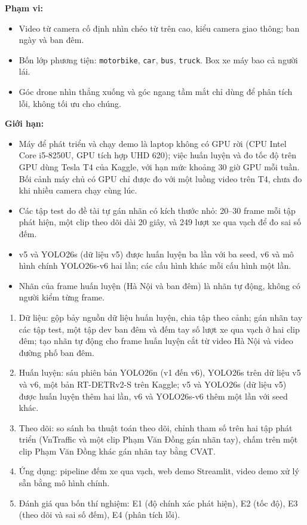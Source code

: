 
\textbf{Phạm vi:}
\begin{itemize}
  \item Video từ camera cố định nhìn chéo từ trên cao, kiểu camera giao thông; ban ngày và ban đêm.
  \item Bốn lớp phương tiện: \texttt{motorbike}, \texttt{car}, \texttt{bus}, \texttt{truck}. Box xe máy bao cả người lái.
  \item Góc drone nhìn thẳng xuống và góc ngang tầm mắt chỉ dùng để phân tích lỗi, không tối ưu cho chúng.
\end{itemize}

\textbf{Giới hạn:}
\begin{itemize}
  \item Máy để phát triển và chạy demo là laptop không có GPU rời (CPU Intel Core i5-8250U, GPU tích hợp UHD 620);
        việc huấn luyện và đo tốc độ trên GPU dùng Tesla T4 của Kaggle, với hạn mức khoảng 30 giờ GPU mỗi tuần. Bối cảnh
        máy chủ có GPU chỉ được đo với một luồng video trên T4, chưa đo khi nhiều camera chạy cùng lúc.
  \item Các tập test do đề tài tự gán nhãn có kích thước nhỏ: 20--30 frame mỗi tập phát hiện, một clip theo dõi dài 20
        giây, và 249 lượt xe qua vạch để đo sai số đếm.
  \item v5 và YOLO26s (dữ liệu v5) được huấn luyện ba lần với ba seed, v6 và mô hình chính YOLO26s-v6 hai lần; các
        cấu hình khác mỗi cấu hình một lần.
  \item Nhãn của frame huấn luyện (Hà Nội và ban đêm) là nhãn tự động, không có người kiểm từng frame.
\end{itemize}


\begin{enumerate}
  \item Dữ liệu: gộp bảy nguồn dữ liệu huấn luyện, chia tập theo cảnh; gán nhãn tay các tập test, một tập dev ban đêm
        và đếm tay số lượt xe qua vạch ở hai clip đêm; tạo nhãn tự động cho frame huấn luyện cắt từ video Hà Nội và
        video đường phố ban đêm.
  \item Huấn luyện: sáu phiên bản YOLO26n (v1 đến v6), YOLO26s trên dữ liệu v5 và v6, một bản RT-DETRv2-S trên
        Kaggle; v5 và YOLO26s (dữ liệu v5) được huấn luyện thêm hai lần, v6 và YOLO26s-v6 thêm một lần với seed khác.
  \item Theo dõi: so sánh ba thuật toán theo dõi, chỉnh tham số trên hai tập phát triển (VnTraffic và một clip Phạm Văn
        Đồng gán nhãn tay), chấm trên một clip Phạm Văn Đồng khác gán nhãn tay bằng CVAT.
  \item Ứng dụng: pipeline đếm xe qua vạch, web demo Streamlit, video demo xử lý sẵn bằng mô hình chính.
  \item Đánh giá qua bốn thí nghiệm: E1 (độ chính xác phát hiện), E2 (tốc độ), E3 (theo dõi và sai số đếm), E4 (phân
        tích lỗi).
\end{enumerate}

